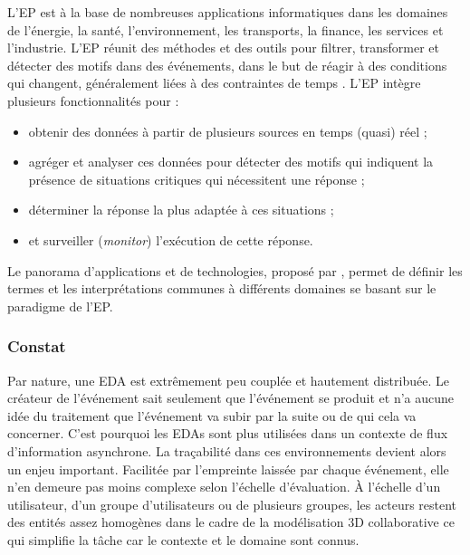 L'\gls{EP} est à la base de nombreuses applications informatiques dans les domaines de l'énergie, la santé, l'environnement, les transports, la finance, les services et l'industrie. L'\gls{EP} réunit des méthodes et des outils 
pour filtrer, transformer et détecter des motifs dans des événements, dans le but 
de réagir à des conditions qui changent, généralement liées à des contraintes de 
temps \cite{Chandy2011}. L'\gls{EP} intègre plusieurs fonctionnalités pour :
\begin{itemize}
	\item obtenir des données à partir de plusieurs sources en temps (quasi) réel ;
	\item agréger et analyser ces données pour détecter des motifs qui indiquent la 
	présence de situations critiques qui nécessitent une réponse ;
	\item déterminer la réponse la plus adaptée à ces situations ;
	\item et surveiller (\textit{monitor}) l'exécution de cette réponse.
\end{itemize}

Le panorama d'applications et de technologies, proposé par \cite{Hinze2009},
permet de définir les termes et les interprétations communes à différents 
domaines se basant sur le paradigme de l'\gls{EP}. 





\subsubsection{Constat}

Par nature, une \gls{EDA} est extrêmement peu couplée et 
hautement distribuée. Le créateur de l'événement sait seulement que l'événement 
se produit et n'a aucune idée du traitement que l'événement va subir par 
la suite ou de qui cela va concerner. 
C'est pourquoi les \glspl{EDA} sont plus utilisées dans un 
contexte de flux d'information asynchrone. La traçabilité dans ces environnements 
devient alors un enjeu important. Facilitée par l'empreinte laissée par chaque 
événement, elle n'en demeure pas moins complexe selon l'échelle d'évaluation. À 
l'échelle d'un utilisateur, d'un groupe d'utilisateurs ou de plusieurs groupes, les
acteurs restent des entités assez homogènes dans le cadre de la modélisation 
\gls{3D} collaborative ce qui simplifie la tâche car le contexte et le domaine sont
connus.



